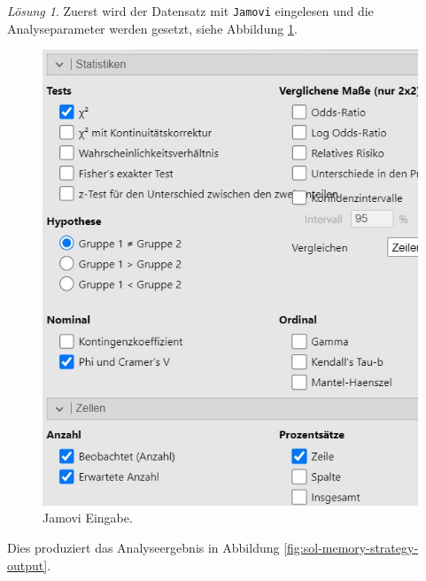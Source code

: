 \documentclass[
]{book}
\theoremstyle{definition}
\theoremstyle{definition}
\theoremstyle{definition}
\theoremstyle{definition}
\theoremstyle{remark}
\newtheorem*{solution}{Lösung}
\begin{document}
\begin{solution}

Zuerst wird der Datensatz mit \texttt{Jamovi} eingelesen und die
Analyseparameter werden gesetzt, siehe Abbildung
\ref{fig:sol-memory-strategy-input}.

\begin{figure}

{\centering \includegraphics{figures/10-exr-memory-strategy-jmv-input} 

}

\caption{Jamovi Eingabe.}\label{fig:sol-memory-strategy-input}
\end{figure}

Dies produziert das Analyseergebnis in Abbildung
\ref{fig:sol-memory-strategy-output}.

\begin{figure}


\end{figure}
\end{solution}
\end{document}

